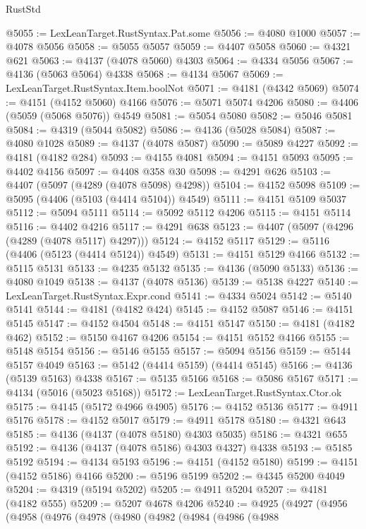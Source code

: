 \begin{lexlean}{RustStd}
\begin{coremodule}
{\begin{coremodule}
{{{{{{{{{{{{{{{{{{{{{{{{{{{{{{{{{{{{{{{{{{{{{{{{{{@5055 := LexLeanTarget.RustSyntax.Pat.some
@5056 := @4080 @1000
@5057 := @4078 @5056
@5058 := @5055 @5057
@5059 := @4407 @5058
@5060 := @4321 @621
@5063 := @4137 (@4078 @5060) @4303
@5064 := @4334 @5056
@5067 := @4136 (@5063 @5064) @4338
@5068 := @4134 @5067
@5069 := LexLeanTarget.RustSyntax.Item.boolNot
@5071 := @4181 (@4342 @5069)
@5074 := @4151 (@4152 @5060) @4166
@5076 := @5071 @5074 @4206
@5080 := @4406 (@5059 (@5068 @5076)) @4549
@5081 := @5054 @5080
@5082 := @5046 @5081
@5084 := @4319 (@5044 @5082)
@5086 := @4136 (@5028 @5084)
@5087 := @4080 @1028
@5089 := @4137 (@4078 @5087)
@5090 := @5089 @4227
@5092 := @4181 (@4182 @284)
@5093 := @4155 @4081
@5094 := @4151 @5093
@5095 := @4402 @4156
@5097 := @4408 @358 @30
@5098 := @4291 @626
@5103 := @4407 (@5097 (@4289 (@4078 @5098) @4298))
@5104 := @4152 @5098
@5109 := @5095 (@4406 (@5103 (@4414 @5104)) @4549)
@5111 := @4151 @5109 @5037
@5112 := @5094 @5111
@5114 := @5092 @5112 @4206
@5115 := @4151 @5114
@5116 := @4402 @4216
@5117 := @4291 @638
@5123 := @4407 (@5097 (@4296 (@4289 (@4078 @5117) @4297)))
@5124 := @4152 @5117
@5129 := @5116 (@4406 (@5123 (@4414 @5124)) @4549)
@5131 := @4151 @5129 @4166
@5132 := @5115 @5131
@5133 := @4235 @5132
@5135 := @4136 (@5090 @5133)
@5136 := @4080 @1049
@5138 := @4137 (@4078 @5136)
@5139 := @5138 @4227
@5140 := LexLeanTarget.RustSyntax.Expr.cond
@5141 := @4334 @5024
@5142 := @5140 @5141
@5144 := @4181 (@4182 @424)
@5145 := @4152 @5087
@5146 := @4151 @5145
@5147 := @4152 @4504
@5148 := @4151 @5147
@5150 := @4181 (@4182 @462)
@5152 := @5150 @4167 @4206
@5154 := @4151 @5152 @4166
@5155 := @5148 @5154
@5156 := @5146 @5155
@5157 := @5094 @5156
@5159 := @5144 @5157 @4049
@5163 := @5142 (@4414 @5159) (@4414 @5145)
@5166 := @4136 (@5139 @5163) @4338
@5167 := @5135 @5166
@5168 := @5086 @5167
@5171 := @4134 (@5016 (@5023 @5168))
@5172 := LexLeanTarget.RustSyntax.Ctor.ok
@5175 := @4145 (@5172 @4966 @4905)
@5176 := @4152 @5136
@5177 := @4911 @5176
@5178 := @4152 @5017
@5179 := @4911 @5178
@5180 := @4321 @643
@5185 := @4136 (@4137 (@4078 @5180) @4303 @5035)
@5186 := @4321 @655
@5192 := @4136 (@4137 (@4078 @5186) @4303 @4327) @4338
@5193 := @5185 @5192
@5194 := @4134 @5193
@5196 := @4151 (@4152 @5180)
@5199 := @4151 (@4152 @5186) @4166
@5200 := @5196 @5199
@5202 := @4345 @5200 @4049
@5204 := @4319 (@5194 @5202)
@5205 := @4911 @5204
@5207 := @4181 (@4182 @555)
@5209 := @5207 @4678 @4206
@5240 := @4925
    (@4927
      (@4956
        (@4958
          (@4976
            (@4978
              (@4980
                (@4982
                  (@4984
                    (@4986
                      (@4988
}}}}}}}}}}}}}}}}}}}}}}}}}}}}}}}}}}}}}}}}}}}}}}}}}}
\end{coremodule}}
\end{coremodule}
\end{lexlean}
